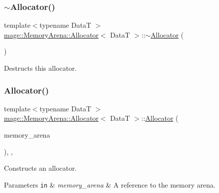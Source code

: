 \subsubsection{\texorpdfstring{$\sim$\+Allocator()}{~Allocator()}}
{\footnotesize\ttfamily template$<$typename DataT $>$ \\
\mbox{\hyperlink{classmage_1_1_memory_arena_1_1_allocator}{mage\+::\+Memory\+Arena\+::\+Allocator}}$<$ DataT $>$\+::$\sim$\mbox{\hyperlink{classmage_1_1_memory_arena_1_1_allocator}{Allocator}} (\begin{DoxyParamCaption}{ }\end{DoxyParamCaption})\hspace{0.3cm}{\ttfamily [default]}}

Destructs this allocator. \mbox{\label{classmage_1_1_memory_arena_1_1_allocator_a0e4b65dba593a1fc8b77e7f2c4ad9659}} 
\subsubsection{\texorpdfstring{Allocator()}{Allocator()}\hspace{0.1cm}{\footnotesize\ttfamily [4/4]}}
{\footnotesize\ttfamily template$<$typename DataT $>$ \\
\mbox{\hyperlink{classmage_1_1_memory_arena_1_1_allocator}{mage\+::\+Memory\+Arena\+::\+Allocator}}$<$ DataT $>$\+::\mbox{\hyperlink{classmage_1_1_memory_arena_1_1_allocator}{Allocator}} (\begin{DoxyParamCaption}\item[{\mbox{\hyperlink{namespacemage_a8769f9d670d6b585ea306cb1062af94b}{Not\+Null}}$<$ \mbox{\hyperlink{classmage_1_1_memory_arena}{Memory\+Arena}} $\ast$ $>$}]{memory\+\_\+arena }\end{DoxyParamCaption})\hspace{0.3cm}{\ttfamily [explicit]}, {\ttfamily [private]}, {\ttfamily [noexcept]}}

Constructs an allocator.


\begin{DoxyParams}[1]{Parameters}
\mbox{\tt in}  & {\em memory\+\_\+arena} & A reference to the memory arena. \\
\hline
\end{DoxyParams}


